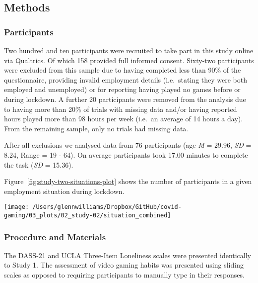 \documentclass[
  english,
  man,floatsintext]{apa6}
\begin{document}
\hypertarget{methods-1}{%
\subsection{Methods}\label{methods-1}}

\hypertarget{participants-1}{%
\subsubsection{Participants}\label{participants-1}}

Two hundred and ten participants were recruited to take part in this study online via Qualtrics. Of which 158 provided full informed consent. Sixty-two participants were excluded from this sample due to having completed less than 90\% of the questionnaire, providing invalid employment details (i.e.~stating they were both employed and unemployed) or for reporting having played no games before or during lockdown. A further 20 participants were removed from the analysis due to having more than 20\% of trials with missing data and/or having reported hours played more than 98 hours per week (i.e.~an average of 14 hours a day). From the remaining sample, only no trials had missing data.

After all exclusions we analysed data from 76 participants (age \emph{M} = 29.96, \emph{SD} = 8.24, Range = 19 - 64). On average participants took 17.00 minutes to complete the task (\emph{SD} = 15.36).

Figure~\ref{fig:study-two-situations-plot} shows the number of participants in a given employment situation during lockdown.

\begin{figure*}[!htbp]

{\centering \texttt{[image: /Users/glennwilliams/Dropbox/GitHub/covid-gaming/03\_plots/02\_study-02/situation\_combined]} 

}

\caption{Count of participants by self-reported (a) employment status, (b) lockdown work situation, and (c) living situation.}\label{fig:study-two-situations-plot}
\end{figure*}

\hypertarget{procedure-and-materials-1}{%
\subsubsection{Procedure and Materials}\label{procedure-and-materials-1}}

The DASS-21 and UCLA Three-Item Loneliness scales were presented identically to Study 1. The assessment of video gaming habits was presented using sliding scales as opposed to requiring participants to manually type in their responses.
\end{document}
